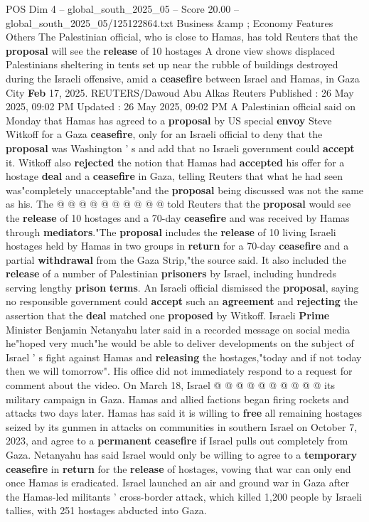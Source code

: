 \begin{textsample}{POS Dim 4 – global\_south\_2025\_05 – Score 20.00 – global\_south\_2025\_05/125122864.txt}  \label{ex:f4_pos_098}
Business \&amp ; Economy Features Others The Palestinian official, who is close to Hamas, has told Reuters that the \textbf{proposal} will see the \textbf{release} of 10 hostages A drone view shows displaced Palestinians sheltering in tents set up near the rubble of buildings destroyed during the Israeli offensive, amid a \textbf{ceasefire} between Israel and Hamas, in Gaza City \textbf{Feb} 17, 2025.
REUTERS/Dawoud Abu Alkas Reuters Published : 26 May 2025, 09:02 PM Updated : 26 May 2025, 09:02 PM A Palestinian official said on Monday that Hamas has agreed to a \textbf{proposal} by US special \textbf{envoy} Steve Witkoff for a Gaza \textbf{ceasefire}, only for an Israeli official to deny that the \textbf{proposal} was Washington ' s and add that no Israeli government could \textbf{accept} it.
Witkoff also \textbf{rejected} the notion that Hamas had \textbf{accepted} his offer for a hostage \textbf{deal} and a \textbf{ceasefire} in Gaza, telling Reuters that what he had seen was"completely unacceptable"and the \textbf{proposal} being discussed was not the same as his.
The @ @ @ @ @ @ @ @ @ @ told Reuters that the \textbf{proposal} would see the \textbf{release} of 10 hostages and a 70-day \textbf{ceasefire} and was received by Hamas through \textbf{mediators}."The \textbf{proposal} includes the \textbf{release} of 10 living Israeli hostages held by Hamas in two groups in \textbf{return} for a 70-day \textbf{ceasefire} and a partial \textbf{withdrawal} from the Gaza Strip,"the source said.
It also included the \textbf{release} of a number of Palestinian \textbf{prisoners} by Israel, including hundreds serving lengthy \textbf{prison} \textbf{terms}.
An Israeli official dismissed the \textbf{proposal}, saying no responsible government could \textbf{accept} such an \textbf{agreement} and \textbf{rejecting} the assertion that the \textbf{deal} matched one \textbf{proposed} by Witkoff.
Israeli \textbf{Prime} Minister Benjamin Netanyahu later said in a recorded message on social media he"hoped very much"he would be able to deliver developments on the subject of Israel ' s fight against Hamas and \textbf{releasing} the hostages,"today and if not today then we will tomorrow".
His office did not immediately respond to a request for comment about the video.
On March 18, Israel @ @ @ @ @ @ @ @ @ @ its military campaign in Gaza.
Hamas and allied factions began firing rockets and attacks two days later.
Hamas has said it is willing to \textbf{free} all remaining hostages seized by its gunmen in attacks on communities in southern Israel on October 7, 2023, and agree to a \textbf{permanent} \textbf{ceasefire} if Israel pulls out completely from Gaza.
Netanyahu has said Israel would only be willing to agree to a \textbf{temporary} \textbf{ceasefire} in \textbf{return} for the \textbf{release} of hostages, vowing that war can only end once Hamas is eradicated.
Israel launched an air and ground war in Gaza after the Hamas-led militants ' cross-border attack, which killed 1,200 people by Israeli tallies, with 251 hostages abducted into Gaza.


\end{textsample}
